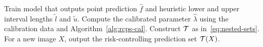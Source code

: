 \begin{algorithm}[t]
\caption{Generating Image-Valued RCPS}
\label{alg:explanatory}

\begin{algorithmic}[1]

\State Train model that outputs point prediction $\hat{f}$ and heuristic lower and upper interval lengths $\tilde{l}$ and $\tilde{u}$.
\State Compute the calibrated parameter $\hat{\lambda}$ using the calibration data and Algorithm~\ref{alg:rcps-cal}.
\State Construct $\mathcal{T}$ as in~\eqref{eq:nested-sets}.
\State For a new image $X$, output the risk-controlling prediction set $\mathcal{T}(X)$.

\end{algorithmic}

\end{algorithm}